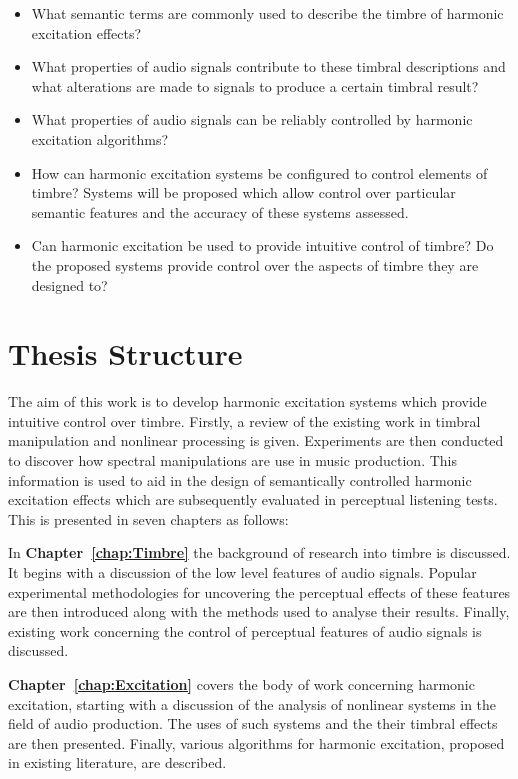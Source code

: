 	\begin{itemize}
		\item What semantic terms are commonly used to describe the timbre of harmonic excitation effects? 
		\item What properties of audio signals contribute to these timbral descriptions and what alterations are
		      made to signals to produce a certain timbral result?
		\item What properties of audio signals can be reliably controlled by harmonic excitation algorithms?
		\item How can harmonic excitation systems be configured to control elements of timbre? Systems will be
		      proposed which allow control over particular semantic features and the accuracy of these systems
		      assessed.
		\item Can harmonic excitation be used to provide intuitive control of timbre? Do the proposed systems
		      provide control over the aspects of timbre they are designed to?
	\end{itemize}

\section{Thesis Structure}
\label{sec:Introduction-ThesisStructure}
	The aim of this work is to develop harmonic excitation systems which provide intuitive control over timbre.
	Firstly, a review of the existing work in timbral manipulation and nonlinear processing is given. Experiments are
	then conducted to discover how spectral manipulations are use in music production. This information is used to aid
	in the design of semantically controlled harmonic excitation effects which are subsequently evaluated in perceptual
	listening tests. This is presented in seven chapters as follows:

	In {\bf{Chapter~\ref{chap:Timbre}}} the background of research into timbre is discussed. It begins with a discussion
	of the low level features of audio signals. Popular experimental methodologies for uncovering the perceptual effects
	of these features are then introduced along with the methods used to analyse their results. Finally, existing work
	concerning the control of perceptual features of audio signals is discussed.

	{\bf{Chapter~\ref{chap:Excitation}}} covers the body of work concerning harmonic excitation, starting with a
	discussion of the analysis of nonlinear systems in the field of audio production. The uses of such systems and the
	their timbral effects are then presented. Finally, various algorithms for harmonic excitation, proposed in existing
	literature, are described.

